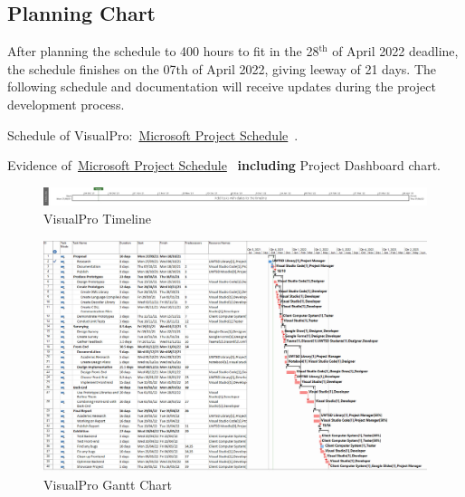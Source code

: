 \documentclass[conference]{IEEEtran}
\begin{document}
      \begin{landscape}
        \thispagestyle{fancylandscape}
        \subsection{Planning Chart}
        \label{subsec:rp-planningChart}
          After planning the schedule to 400 hours to fit in the 28$^{\text{th}}$ of April 2022 deadline, the schedule finishes on the 07${\text{th}}$ of April 2022, giving leeway of 21 days. The following schedule and documentation will receive updates during the project development process.

          Schedule of VisualPro:~\href{https://github.com/ShinkuKira21/VisualPro-FinalProject/blob/main/Project/VisualPro.mpp?raw=true}{Microsoft Project Schedule}~\cite{patch_visualpro_2021}.
          
          Evidence of~\href{https://github.com/ShinkuKira21/VisualPro-FinalProject/blob/main/Project/Plan.docx?raw=true}{Microsoft Project Schedule}~\cite{patch_visualpro_2021-1} \textbf{including} Project Dashboard chart.

          \begin{figure}[h]
            \includegraphics[width=1.30\textwidth]{Figures/timeline.jpg}
            \caption{VisualPro Timeline}
          \end{figure}

          \begin{figure}[h]
            \includegraphics[height=.65\textheight, width=1.30\textwidth]{Figures/VisualPro.jpg}
            \caption{VisualPro Gantt Chart}
          \end{figure}
      \end{landscape}
\end{document}
